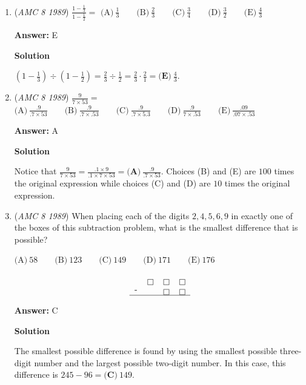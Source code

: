 \begin{enumerate}
	\item (\textit{AMC 8 1989}) $\frac{1-\frac{1}{3}}{1-\frac{1}{2}} =$
$\text{(A)}\ \frac{1}{3} \qquad \text{(B)}\ \frac{2}{3} \qquad \text{(C)}\ \frac{3}{4} \qquad \text{(D)}\ \frac{3}{2} \qquad \text{(E)}\ \frac{4}{3}$

 \textbf{Answer: }E



\textbf{Solution}

$\left(1-\frac{1}{3}\right) \div \left(1-\frac{1}{2}\right) = \frac{2}{3} \div \frac{1}{2} = \frac{2}{3} \cdot \frac{2}{1} = \boxed{\textbf{(E)}\ \frac{4}{3}}$.

 


	\item (\textit{AMC 8 1989}) $\frac{9}{7\times 53} =$
$\text{(A)}\ \frac{.9}{.7\times 53} \qquad \text{(B)}\ \frac{.9}{.7\times .53} \qquad \text{(C)}\ \frac{.9}{.7\times 5.3} \qquad \text{(D)}\ \frac{.9}{7\times .53} \qquad \text{(E)}\ \frac{.09}{.07\times .53}$

 \textbf{Answer: }A



\textbf{Solution}

Notice that $\frac{9}{7 \times 53} = \frac{.1 \times 9}{.1 \times 7 \times 53} = \boxed{\textbf{(A)}\ \frac{.9}{.7 \times 53}}$.  Choices (B) and (E) are $100$ times the original expression while choices (C) and (D) are $10$ times the original expression.

 


	\item (\textit{AMC 8 1989}) When placing each of the digits $2,4,5,6,9$ in exactly one of the boxes of this subtraction problem, what is the smallest difference that is possible?


 $\text{(A)}\ 58 \qquad \text{(B)}\ 123 \qquad \text{(C)}\ 149 \qquad \text{(D)}\ 171 \qquad \text{(E)}\ 176$

 \[\begin{tabular}[t]{cccc}  & \boxed{} & \boxed{} & \boxed{} \\ - & & \boxed{} & \boxed{} \\ \hline \end{tabular}\]

 \textbf{Answer: }C



\textbf{Solution}

The smallest possible difference is found by using the smallest possible three-digit number and the largest possible two-digit number.  In this case, this difference is $245-96=\boxed{\textbf{(C)}\ 149}$.


\end{enumerate}
